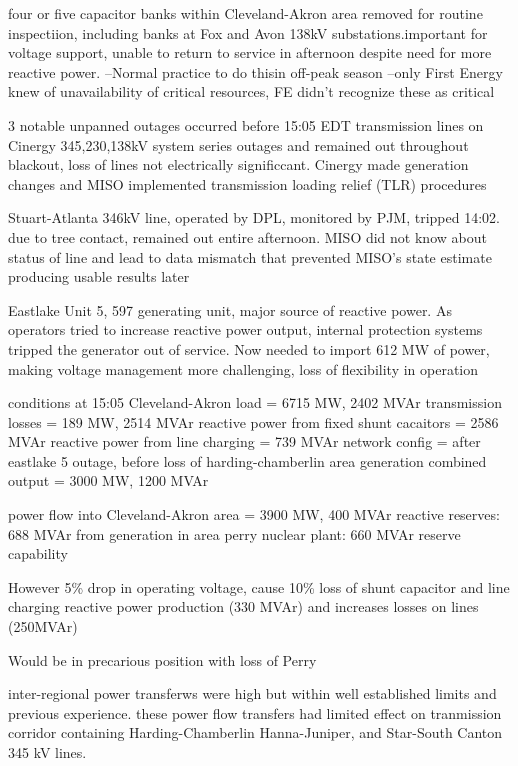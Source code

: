 four or five capacitor banks within Cleveland-Akron area removed for routine inspectiion, including banks at Fox and Avon 138kV substations.important for voltage support, unable to return to service in afternoon despite need for more reactive power.
--Normal practice to do thisin off-peak season
--only First Energy knew of unavailability of critical resources, FE didn't recognize these as critical

3 notable unpanned outages occurred before 15:05 EDT
transmission lines on Cinergy 345,230,138kV system series outages and remained out throughout blackout, loss of lines not electrically significcant.  Cinergy made generation changes and  MISO implemented transmission loading relief (TLR) procedures

Stuart-Atlanta 346kV line, operated by DPL, monitored by PJM, tripped 14:02.  due to tree contact, remained out entire afternoon.  MISO did not know about status of line and lead to data mismatch that prevented MISO's state estimate producing usable results later

Eastlake Unit 5, 597 generating unit, major source of reactive power.  As operators tried to increase reactive power output, internal protection systems tripped the generator out of service.  Now needed to import 612 MW of power, making voltage management more challenging, loss of flexibility in operation

conditions at 15:05
Cleveland-Akron load = 6715 MW, 2402 MVAr
transmission losses = 189 MW, 2514 MVAr
reactive power from fixed shunt cacaitors = 2586 MVAr
reactive power from line charging = 739 MVAr
network config = after eastlake 5 outage, before loss of harding-chamberlin
area generation combined output = 3000 MW, 1200 MVAr

power flow into Cleveland-Akron area = 3900 MW, 400 MVAr
reactive reserves: 688 MVAr from generation in area
perry nuclear plant: 660 MVAr reserve capability

However 5\% drop in operating voltage, cause 10\% loss of shunt capacitor and line charging reactive power production (330 MVAr) and increases losses on lines (250MVAr)

Would be in precarious position with loss of Perry

inter-regional power transferws were high but within well established limits and previous experience.  these power flow transfers had limited effect on tranmission corridor containing Harding-Chamberlin Hanna-Juniper, and Star-South Canton 345 kV lines.

